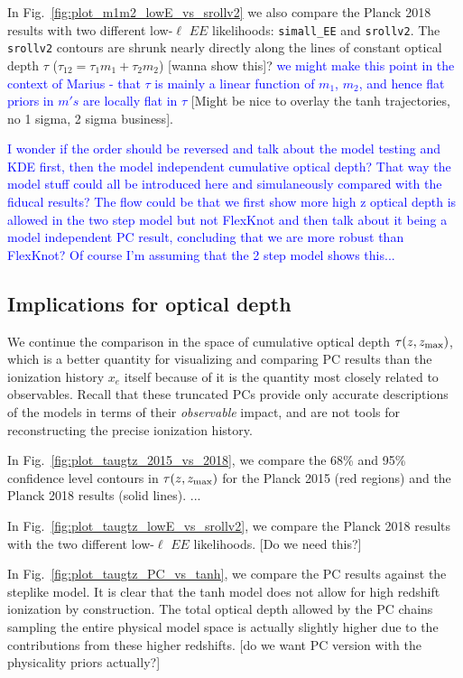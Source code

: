 \documentclass[prd,twocolumn,amsmath,amssymb,floatfix,superscriptaddress,nofootinbib]{revtex4-1}
\newcommand{\zmax}{z_{\rm max}}
\newcommand{\wh}[1]{\textcolor{blue}{#1}}
\begin{document}
In Fig.~\ref{fig:plot_m1m2_lowE_vs_srollv2} we also compare the Planck 2018 results with two different low-$\ell$ $EE$ likelihoods: \texttt{simall\_EE} and \texttt{srollv2}. The \texttt{srollv2} contours are shrunk nearly directly along the lines of constant optical depth $\tau$ ($\tau_{12} = \tau_1 m_1 + \tau_2 m_2$) [wanna show this]? \wh{we might make this point in the context of Marius - that $\tau$ is mainly a linear function of $m_1$, $m_2$, and hence flat priors in $m's$ are locally flat in $\tau$}  [Might be nice to overlay the tanh trajectories, no 1 sigma, 2 sigma business]. 

\wh{I wonder if the order should be reversed and talk about the model testing and KDE first, then the model independent cumulative optical depth?  That way the model stuff could all be introduced here and simulaneously compared with the fiducal results?  The flow could be that we first show more high z optical depth is allowed in the two step model but not FlexKnot and then talk about it being a model independent PC result, concluding that we are more robust than FlexKnot?  Of course I'm assuming that the 2 step model shows this...}

\subsection{Implications for optical depth}

We continue the comparison in the space of cumulative optical depth $\tau(z, \zmax)$, which is a better quantity for visualizing and comparing PC results than the ionization history $x_e$ itself because of it is the quantity most closely related to observables. Recall that these truncated PCs provide only accurate descriptions of the models in terms of their \textit{observable} impact, and are not tools for reconstructing the precise ionization history.

In Fig.~\ref{fig:plot_taugtz_2015_vs_2018}, we compare the 68\% and 95\% confidence level contours in $\tau(z, \zmax)$ for the Planck 2015 (red regions) and the Planck 2018 results (solid lines).
...

In Fig.~\ref{fig:plot_taugtz_lowE_vs_srollv2}, we compare the Planck 2018 results with the two different low-$\ell$ $EE$ likelihoods. [Do we need this?]

In Fig.~\ref{fig:plot_taugtz_PC_vs_tanh}, we compare the PC results against the steplike model. It is clear that the tanh model does not allow for high redshift ionization by construction. The total optical depth allowed by the PC chains sampling the entire physical model space is actually slightly higher due to the contributions from these higher redshifts. [do we want PC version with the physicality priors actually?]\\
\end{document}
